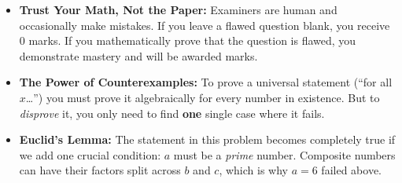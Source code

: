 \begin{takeaways}
\begin{itemize}[leftmargin=*]
\item \textbf{Trust Your Math, Not the Paper:} Examiners are human and occasionally make mistakes. If you leave a flawed question blank, you receive 0 marks. If you mathematically prove that the question is flawed, you demonstrate mastery and will be awarded marks.
\item \textbf{The Power of Counterexamples:} To prove a universal statement (``for all $x$\ldots'') you must prove it algebraically for every number in existence. But to \textit{disprove} it, you only need to find \textbf{one} single case where it fails.
\item \textbf{Euclid's Lemma:} The statement in this problem becomes completely true if we add one crucial condition: $a$ must be a \textit{prime} number. Composite numbers can have their factors split across $b$ and $c$, which is why $a=6$ failed above.
\end{itemize}
\end{takeaways}
